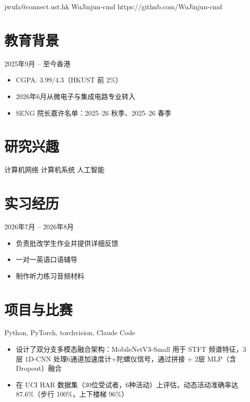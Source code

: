 \documentclass{common/resume}
\begin{document}
  {jwufa@connect.ust.hk}
  {WuJinjun-cmd}
  {https://github.com/WuJinjun-cmd}

\section{教育背景}

  {2025年9月 -- 至今}{香港}

\begin{itemize}
  \item CGPA: 3.99/4.3（HKUST 前 2\%）
  \item 2026年6月从微电子与集成电路专业转入
  \item SENG 院长嘉许名单：2025--26 秋季、2025--26 春季
\end{itemize}

\section{研究兴趣}

计算机网络 \textbullet{} 计算机系统 \textbullet{} 人工智能

\section{实习经历}

  {2026年7月 -- 2026年8月}{}

\begin{itemize}
  \item 负责批改学生作业并提供详细反馈
  \item 一对一英语口语辅导
  \item 制作听力练习音频材料
\end{itemize}

\section{项目与比赛}

  {Python, PyTorch, torchvision, Claude Code}

\begin{itemize}
  \item 设计了双分支多模态融合架构：MobileNetV3-Small 用于 STFT 频谱特征，3层 1D-CNN 处理6通道加速度计+陀螺仪信号，通过拼接 + 2层 MLP（含 Dropout）融合
  \item 在 UCI HAR 数据集（30位受试者，6种活动）上评估，动态活动准确率达 87.6\%（步行 100\%，上下楼梯 96\%）
\end{itemize}
\end{document}
